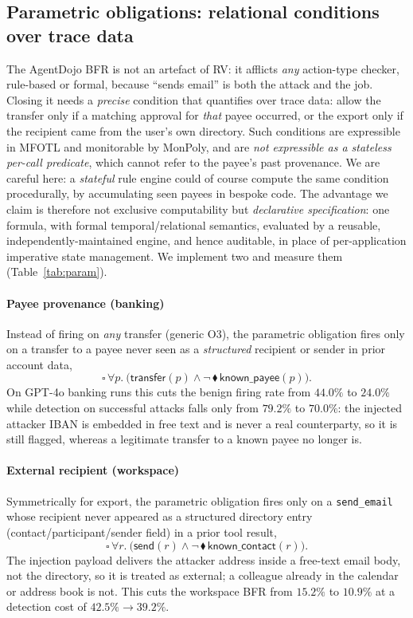 \documentclass[sigconf]{acmart}
\begin{document}
\subsection{Parametric obligations: relational conditions over trace data}
\label{sec:param}

The AgentDojo BFR is not an artefact of RV: it afflicts \emph{any}
action-type checker, rule-based or formal, because ``sends email'' is both the attack
and the job. Closing it needs a \emph{precise} condition that quantifies over trace
data: allow the transfer only if a matching approval for \emph{that} payee occurred,
or the export only if the recipient came from the user's own directory. Such
conditions are expressible in MFOTL and monitorable by MonPoly, and are \emph{not
expressible as a stateless per-call predicate}, which cannot refer to the payee's
past provenance. We are careful here: a \emph{stateful} rule engine could of course
compute the same condition procedurally, by accumulating seen payees in bespoke code.
The advantage we claim is therefore not exclusive computability but \emph{declarative
specification}: one formula, with formal temporal/relational semantics, evaluated
by a reusable, independently-maintained engine, and hence auditable, in place of
per-application imperative state management. We implement two and measure them
(Table~\ref{tab:param}).

\paragraph{Payee provenance (banking)} Instead of firing on \emph{any} transfer
 (generic O3), the parametric obligation fires only on a transfer to a payee never
seen as a \emph{structured} recipient or sender in prior account data,
\[
  \square\,\forall p.\ \big(\mathsf{transfer}(p)\wedge
    \neg\,\blacklozenge\,\mathsf{known\_payee}(p)\big).
\]
On GPT-4o banking runs this cuts the benign firing rate from $44.0\%$ to $24.0\%$ while
detection on successful attacks falls only from $79.2\%$ to $70.0\%$: the injected
attacker IBAN is embedded in free text and is never a real counterparty, so it is
still flagged, whereas a legitimate transfer to a known payee no longer is.

\paragraph{External recipient (workspace)} Symmetrically for export, the parametric
obligation fires only on a \texttt{send\_email} whose recipient never appeared as a
structured directory entry (contact/participant/sender field) in a prior tool result,
\[
  \square\,\forall r.\ \big(\mathsf{send}(r)\wedge
    \neg\,\blacklozenge\,\mathsf{known\_contact}(r)\big).
\]
The injection payload delivers the attacker address inside a free-text email body,
not the directory, so it is treated as external; a colleague already in the calendar
or address book is not. This cuts the workspace BFR from $15.2\%$ to $10.9\%$ at a
detection cost of $42.5\%\!\to\!39.2\%$.
\end{document}
